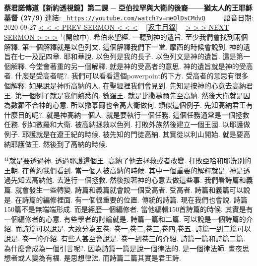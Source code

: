 \documentclass{book}
\begin{document}
\section{}
\label{sec:meOlDsCMdvQ}
\textbf{蔡君諾傳道【新約透視鏡】第二課 ─ 亞伯拉罕與大衛的後裔——猶太人的王耶穌基督 (27/9)}
\newline
\newline
連結: \href{https://youtube.com/watch?v=meOlDsCMdvQ}{\texttt{ https://youtube.com/watch?v=meOlDsCMdvQ}} ~~~~ 語音日期: 2020-09-27 
\newline
\newline
\hyperref[sec:FpXj_b1Te98]{\small{< < < PREV SERMON < < <}}
~
\hyperref[sec:index]{\small{[返主目錄]}}
~
\hyperref[sec:MITfS88PZDg]{\small{> > > NEXT SERMON > > >}}
\newline
\newline
$^{1}$(開啟中).
希伯來聖經.
一聽到神的遺旨.
至少我們會找到兩個解釋.
第一個解釋就是以色列文.
這個解釋我們下一堂.
摩西的時候會說到.
神的遺旨在七一及記四章.
耶和華說.
以色列是我的長子.
以色列文是神的遺旨.
這是第一個解釋.
今堂會著重的另一個解釋.
就是神的受高者的意思.
神的遺旨就是神的受高者.
什麼是受高者呢?.
我們可以看看這個powerpoint的下方.
受高者的意思有很多個解釋.
如果說是神所高納的人.
在聖經裡我們會見到.
先知是按神的心意去高納君王.
第一個例子就是我們熟悉的.
數羅王.
就是比撒慕爾先至高納.
然後大衛就是因為數羅不合神的心意.
所以撒慕爾也令高大衛做何.
類似這個例子.
先知高納君王有什麼目的呢?.
就是神高納一個人.
就是要執行一個任務.
這個任務通常是一個拯救任務.
例如數羅和大衛.
被高納拯救以色列.
打敗外族然後建立一個王國.
以耶護做例子.
耶護就是在遼王紀的時候.
被先知的門徒高納.
其實從以利山開始.
就是要高納耶護做王.
然後到了高納的時候.

$^{41}$就是要透過神.
透過耶護這個王.
高納了他去拯救或者改變.
打敗亞哈和耶洗別的王朝.
在舊約我們看到.
當一個人被高納的時候.
其中一個重要的解釋就是.
神是透過先知去高納他.
去進行一個拯救.
然後按著神的心意去做這些事.
我們看詩篇和義篇.
就會發生一些轉變.
詩篇和義篇就會說一個受高者.
受高者.
詩篇和義篇可以說是.
在詩篇的編修裡面.
有一個很重要的位置.
傳統的詩篇.
現在我們也會說.
詩篇150篇不是無端端形成.
而是經歷一個編修者.
當他編輯150首詩篇的時候.
其實是有一個編修者的心意.
有些學者的討論就是.
詩篇一篇和二篇.
可以說是一個詩篇的介紹.
而詩篇可以說是.
大致分為五卷.
卷一,卷二,卷三,卷四,卷五.
詩篇一到二篇可以說是.
卷一的介紹.
有些人甚至會說是.
卷一到卷三的介紹.
詩篇一篇和詩篇二篇.
為什麼會成為一個引言呢?.
因為詩篇一篇是說一個律法的.
是一個律法師.
晝夜思想者或人變為有福.
是思想律法.
而詩篇二篇其實是君王詩.
\end{document}

